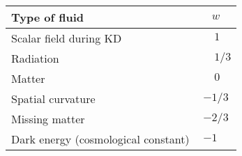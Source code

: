\begin{tabular}{lc}
  \toprule
  Type of fluid & $w$ \\
  \midrule
  Scalar field during KD & $ \phantom{-}1\phantom{/3} $ \\
  Radiation & $ \phantom{-}1/3 $ \\
  Matter & $ \phantom{-}0\phantom{/3} $ \\
  Spatial curvature & $ -1/3$ \\
  Missing matter & $ -2/3$ \\
  Dark energy (cosmological constant) & $ -1\phantom{/3} $ \\
  \bottomrule
\end{tabular}
